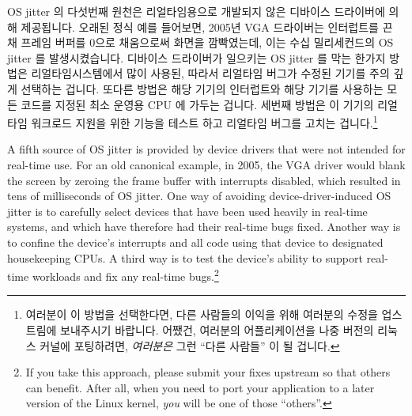 OS jitter 의 다섯번째 원천은 리얼타임용으로 개발되지 않은 디바이스 드라이버에
의해 제공됩니다.
오래된 정식 예를 들어보면, 2005년 VGA 드라이버는 인터럽트를 끈 채 프레임 버퍼를
0으로 채움으로써 화면을 깜빡였는데, 이는 수십 밀리세컨드의 OS jitter 를
발생시켰습니다.
디바이스 드라이버가 일으키는 OS jitter 를 막는 한가지 방법은 리얼타임시스템에서
많이 사용된, 따라서 리얼타임 버그가 수정된 기기를 주의 깊게 선택하는 겁니다.
또다른 방법은 해당 기기의 인터럽트와 해당 기기를 사용하는 모든 코드를 지정된
최소 운영용 CPU 에 가두는 겁니다.
세번째 방법은 이 기기의 리얼타임 워크로드 지원을 위한 기능을 테스트 하고
리얼타임 버그를 고치는 겁니다.\footnote{
	여러분이 이 방법을 선택한다면, 다른 사람들의 이익을 위해 여러분의
	수정을 업스트림에 보내주시기 바랍니다.
	어쨌건, 여러분의 어플리케이션을 나중 버전의 리눅스 커널에 포팅하려면,
	\emph{여러분은} 그런 ``다른 사람들'' 이 될 겁니다.}

\iffalse

A fifth source of OS jitter is provided by device drivers that were
not intended for real-time use.
For an old canonical example, in 2005, the VGA driver would blank
the screen by zeroing the frame buffer with interrupts disabled,
which resulted in tens of milliseconds of OS jitter.
One way of avoiding device-driver-induced OS jitter is to carefully
select devices that have been used heavily in real-time systems,
and which have therefore had their real-time bugs fixed.
Another way is to confine the device's interrupts and all code using
that device to designated housekeeping CPUs.
A third way is to test the device's ability to support real-time
workloads and fix any real-time bugs.\footnote{
	If you take this approach, please submit your fixes upstream
	so that others can benefit.
	After all, when you need to port your application to
	a later version of the Linux kernel, \emph{you} will be one of those
	``others''.}

